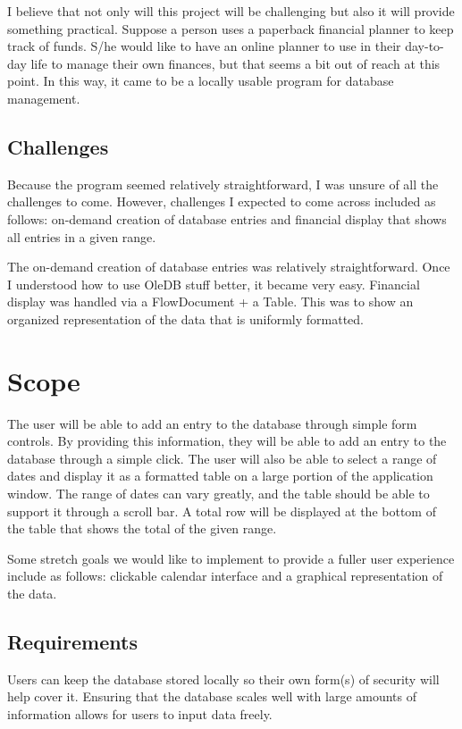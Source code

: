 \documentclass[10pt,conference,onecolumn,compsoc]{IEEEtran}
\begin{document}
I believe that not only will this project will be challenging but also it will provide something practical. Suppose a person uses a paperback financial planner to keep track of funds. S/he would like to have an online planner to use in their day-to-day life to manage their own finances, but that seems a bit out of reach at this point. In this way, it came to be a locally usable program for database management.


\subsection{Challenges}
Because the program seemed relatively straightforward, I was unsure of all the challenges to come. However, challenges I expected to come across included as follows: on-demand creation of database entries and financial display that shows all entries in a given range.

The on-demand creation of database entries was relatively straightforward. Once I understood how to use OleDB stuff better, it became very easy.
Financial display was handled via a FlowDocument + a Table. This was to show an organized representation of the data that is uniformly formatted.


\section{Scope}
The user will be able to add an entry to the database through simple form controls. By providing this information, they will be able to add an entry to the database through a simple click. The user will also be able to select a range of dates and display it as a formatted table on a large portion of the application window. The range of dates can vary greatly, and the table should be able to support it through a scroll bar. A total row will be displayed at the bottom of the table that shows the total of the given range.

Some stretch goals we would like to implement to provide a fuller user experience include as follows: clickable calendar interface and a graphical representation of the data.

\subsection{Requirements}
Users can keep the database stored locally so their own form(s) of security will help cover it. Ensuring that the database scales well with large amounts of information allows for users to input data freely.
\end{document}
